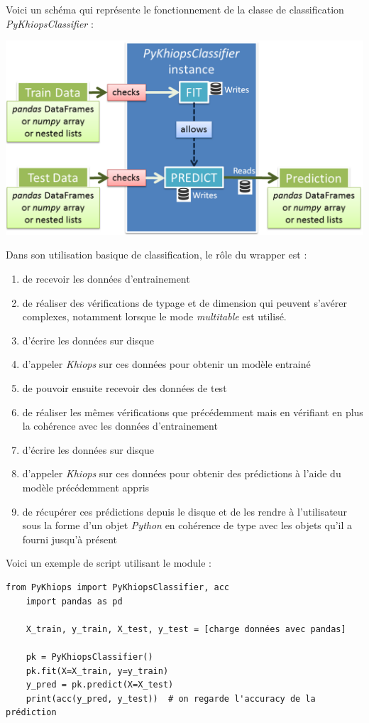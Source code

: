 \documentclass[12pt]{report}
\begin{document}
	Voici un schéma qui représente le fonctionnement de la classe de classification \textit{PyKhiopsClassifier} :
	\begin{center}
		\includegraphics[scale=0.55]{pykhiops_.png}
	\end{center}
	Dans son utilisation basique de classification, le rôle du wrapper est :
	\begin{enumerate}
		\item de recevoir les données d'entrainement
		\item de réaliser des vérifications de typage et de dimension qui peuvent s'avérer complexes, notamment lorsque le mode \textit{multitable} est utilisé.
		\item d'écrire les données sur disque
		\item d'appeler \textit{Khiops} sur ces données pour obtenir un modèle entrainé
		\item de pouvoir ensuite recevoir des données de test
		\item de réaliser les mêmes vérifications que précédemment mais en vérifiant en plus la cohérence avec les données d'entrainement
		\item d'écrire les données sur disque
		\item d'appeler \textit{Khiops} sur ces données pour obtenir des prédictions à l'aide du modèle précédemment appris
		\item de récupérer ces prédictions depuis le disque et de les rendre à l'utilisateur sous la forme d'un objet \textit{Python} en cohérence de type avec les objets qu'il a fourni jusqu'à présent
	\end{enumerate}
	
	Voici un exemple de script utilisant le module :
	\begin{lstlisting}[style=py]
	from PyKhiops import PyKhiopsClassifier, acc
	import pandas as pd
	
	X_train, y_train, X_test, y_test = [charge données avec pandas]
	
	pk = PyKhiopsClassifier()
	pk.fit(X=X_train, y=y_train)
	y_pred = pk.predict(X=X_test)
	print(acc(y_pred, y_test))  # on regarde l'accuracy de la prédiction
	\end{lstlisting}
	
\end{document}
